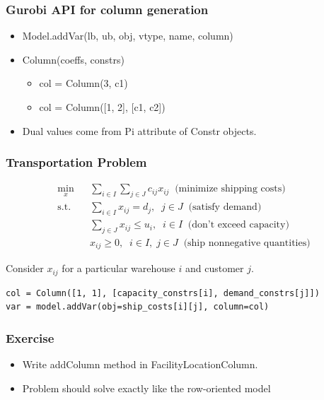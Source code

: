 \documentclass[12pt,handout]{beamer}
\begin{document}
\begin{frame}
\frametitle{Gurobi API for column generation}
\begin{itemize}
\item Model.addVar(lb, ub, obj, vtype, name, column)
\item Column(coeffs, constrs)
     \begin{itemize}
     \item col = Column(3, c1)
     \item col = Column([1, 2], [c1, c2])
     \end{itemize}
\item Dual values come from Pi attribute of Constr objects.
\end{itemize}
\end{frame}

\begin{frame}[containsverbatim]
\frametitle{Transportation Problem}
\begin{eqnarray}
\min_{x} && \sum_{i \in I} \sum_{j \in J} c_{ij} x_{ij} \;\; \mbox{(minimize shipping costs)} \nonumber \\
\mbox{s.t.} && \sum_{i \in I} x_{ij} = d_j,\;\;j \in J \;\; \mbox{(satisfy demand)}\nonumber \\
&& \sum_{j \in J} x_{ij} \le u_i,\;\;i \in I \;\; \mbox{(don't exceed capacity)} \nonumber \\
&& x_{ij} \ge 0, \;\;i \in I,\;j \in J \;\; \mbox{(ship nonnegative quantities)} \nonumber
\end{eqnarray}

Consider $x_{ij}$ for a particular warehouse $i$ and customer $j$.

{\scriptsize
\begin{verbatim} 
col = Column([1, 1], [capacity_constrs[i], demand_constrs[j]])
var = model.addVar(obj=ship_costs[i][j], column=col)
\end{verbatim}
}
\end{frame}

{
\begin{frame}
  \frametitle{Exercise}
  \begin{itemize}
    \item Write addColumn method in FacilityLocationColumn.
    \item Problem should solve exactly like the row-oriented model
  \end{itemize}
\end{frame}
}
\end{document}
